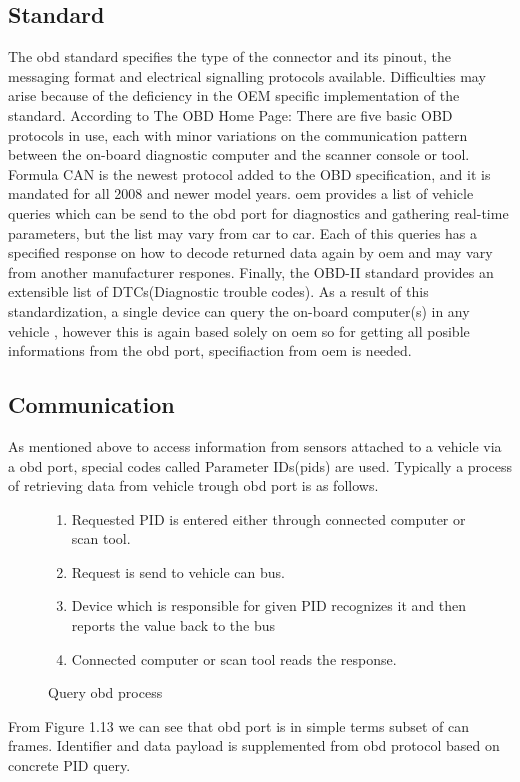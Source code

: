 \subsection{Standard}
The \gls{obd} standard specifies the type of the connector and its pinout, the messaging format and electrical signalling protocols available. Difficulties may arise because of the deficiency in the OEM specific implementation of the standard. According to The OBD Home Page: There are five basic OBD protocols in use, each with minor variations on the communication pattern between the on-board diagnostic computer and the scanner console or tool. Formula CAN is the newest protocol added to the OBD specification, and it is mandated for all 2008 and newer model years\cite{7223296}. \gls{oem} provides a list of vehicle queries which can be send to the \gls{obd} port for diagnostics and gathering real-time parameters, but the list may vary from car to car. Each of this queries has a specified response on how to decode returned data again by \gls{oem} and may vary from another manufacturer respones. Finally, the OBD-II standard provides an extensible list of DTCs(Diagnostic trouble codes). As a result of this standardization, a single device can query the on-board computer(s) in any vehicle \cite{obdiso}, however this is again based solely on \gls{oem} so for getting all posible informations from the \gls{obd} port, specifiaction from \gls{oem} is needed.
\subsection{Communication}
As mentioned above to access information from sensors attached to a vehicle via a \gls{obd} port, special codes called Parameter IDs(\gls{pids}) are used. Typically a process of retrieving data from vehicle trough \gls{obd} port is as follows.
\begin{figure}[H]
\begin{center}
\begin{enumerate}
	\item Requested PID is entered either through connected computer or scan tool.
	\item Request is send to vehicle \gls{can} bus.
	\item Device which is responsible for given PID recognizes it and then reports the value back to the bus
	\item Connected computer or scan tool reads the response.
\end{enumerate}
\captionsetup{font=small}
\label{fig:bul1}
\caption{Query \gls{obd} process}
\end{center}
\end{figure}
From Figure 1.13 we can see that \gls{obd} port is in simple terms subset of \gls{can} frames. Identifier and data payload is supplemented from \gls{obd} protocol based on concrete PID query.
